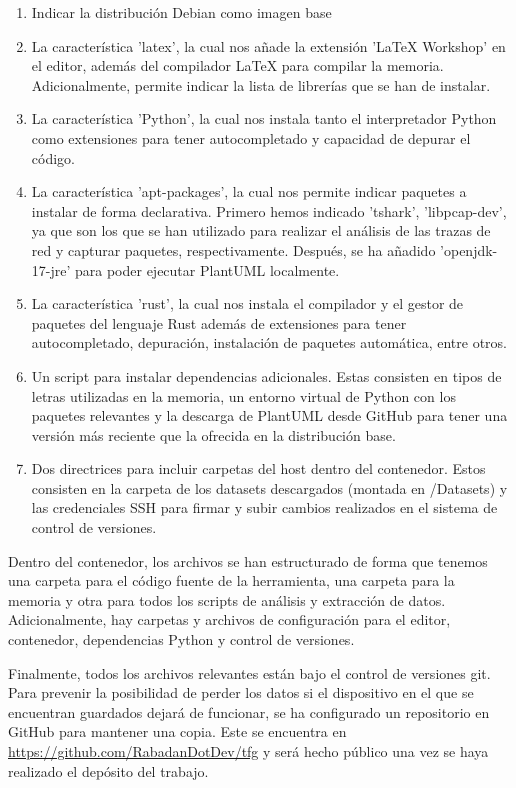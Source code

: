 \begin{enumerate}
    \item Indicar la distribución Debian como imagen base
    \item La característica 'latex', la cual nos añade la extensión 'LaTeX Workshop' en el editor, además del compilador LaTeX para compilar la memoria. Adicionalmente, permite indicar la lista de librerías que se han de instalar.
    \item La característica 'Python', la cual nos instala tanto el interpretador Python como extensiones para tener autocompletado y capacidad de depurar el código.
    \color{blue} %
    \item La característica 'apt-packages', la cual nos permite indicar paquetes a instalar de forma declarativa. Primero hemos indicado 'tshark', 'libpcap-dev', ya que son los que se han utilizado para realizar el análisis de las trazas de red y capturar paquetes, respectivamente. Después, se ha añadido 'openjdk-17-jre' para poder ejecutar PlantUML localmente.
    \color{black} %
    \item La característica 'rust', la cual nos instala el compilador y el gestor de paquetes del lenguaje Rust además de extensiones para tener autocompletado, depuración, instalación de paquetes automática, entre otros.
    \color{blue} %
    \item Un script para instalar dependencias adicionales. Estas consisten en tipos de letras utilizadas en la memoria, un entorno virtual de Python con los paquetes relevantes y la descarga de PlantUML desde GitHub para tener una versión más reciente que la ofrecida en la distribución base.
    \color{black} %
    \item Dos directrices para incluir carpetas del host dentro del contenedor. Estos consisten en la carpeta de los datasets descargados (montada en /Datasets) y las credenciales SSH para firmar y subir cambios realizados en el sistema de control de versiones.
\end{enumerate}

Dentro del contenedor, los archivos se han estructurado de forma que tenemos una carpeta para el código fuente de la herramienta, una carpeta para la memoria y otra para todos los scripts de análisis y extracción de datos. Adicionalmente, hay carpetas y archivos de configuración para el editor, contenedor, dependencias Python y control de versiones.

Finalmente, todos los archivos relevantes están bajo el control de versiones git. Para prevenir la posibilidad de perder los datos si el dispositivo en el que se encuentran guardados dejará de funcionar, se ha configurado un repositorio en GitHub para mantener una copia. Este se encuentra en \url{https://github.com/RabadanDotDev/tfg} y será hecho público una vez se haya realizado el depósito del trabajo.

